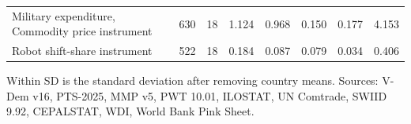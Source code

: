 \begin{table}[htbp]
\begin{tabular}{lrrrrrrr}
Military expenditure, %
Commodity price instrument & 630 & 18 & 1.124 & 0.968 & 0.150 & 0.177 & 4.153 \\
Robot shift-share instrument & 522 & 18 & 0.184 & 0.087 & 0.079 & 0.034 & 0.406 \\
\bottomrule
\end{tabular}
\begin{tablenotes}\footnotesize Within SD is the standard deviation after removing country means. Sources: V-Dem v16, PTS-2025, MMP v5, PWT 10.01, ILOSTAT, UN Comtrade, SWIID 9.92, CEPALSTAT, WDI, World Bank Pink Sheet.\end{tablenotes}
\end{table}
